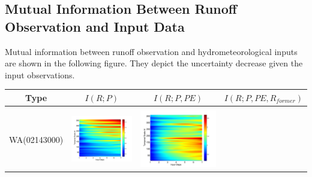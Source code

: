 \documentclass[draft,wrr]{AGUTeX}
\begin{document}
\begin{article}
\subsection{Mutual Information Between Runoff Observation and Input Data}
Mutual information between runoff observation and hydrometeorological inputs are shown in the following figure. They depict the uncertainty decrease given the input observations. 
\begin{table}[H]\small 
\label{MI}
\centering
\begin{tabular}{cccc}
\hline
Type&$I(R;P)$&$I(R;P,PE)$&$I(R;P,PE,R_{former})$\\\hline
\\
WA(02143000)
&\begin{minipage}{.3\textwidth}\includegraphics[width=\linewidth]{resultgraph/02143000p.png}\end{minipage}
&\begin{minipage}{.3\textwidth}\includegraphics[width=\linewidth]{resultgraph/02143000pep.png}\end{minipage}

\end{tabular}
\end{table}
\end{article}
\end{document}
